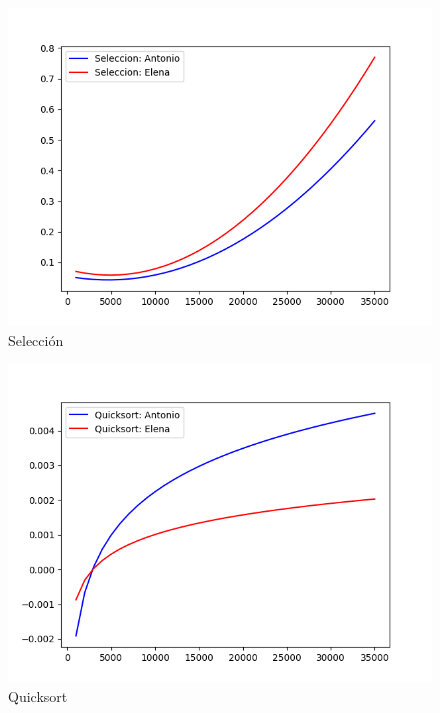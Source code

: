 \documentclass[11pt]{article}
\begin{document}
\begin{figure}
\centering
\includegraphics[scale=0.7]{../graficos/distintos/seleccion.png}
\caption{Selección}
\end{figure}

\begin{figure}
\centering
\includegraphics[scale=0.7]{../graficos/distintos/quicksort.png}
\caption{Quicksort}
\end{figure}
\end{document}
